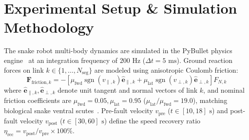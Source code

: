 \documentclass{iopjournal}
\begin{document}
\section{Experimental Setup \& Simulation Methodology}
\label{sec:setup}

The snake robot multi-body dynamics are simulated in the PyBullet physics engine~\cite{coumans2023} at an integration frequency of $200\text{ Hz}$ ($\Delta t = 5\text{ ms}$). Ground reaction forces on link $k \in \{1, \dots, N_{\text{seg}}\}$ are modeled using anisotropic Coulomb friction:
\begin{equation}
\mathbf{F}_{\text{friction}, k} = -\left[\mu_{\text{fwd}} \operatorname{sgn}(v_{\parallel, k}) \hat{\mathbf{e}}_{\parallel, k} + \mu_{\text{lat}} \operatorname{sgn}(v_{\perp, k}) \hat{\mathbf{e}}_{\perp, k}\right] F_{N, k}
\label{eq:friction_model}
\end{equation}
where $\hat{\mathbf{e}}_{\parallel, k}, \hat{\mathbf{e}}_{\perp, k}$ denote unit tangent and normal vectors of link $k$, and nominal friction coefficients are $\mu_{\text{fwd}} = 0.05, \mu_{\text{lat}} = 0.95$ ($\mu_{\text{lat}} / \mu_{\text{fwd}} = 19.0$), matching biological snake ventral scutes~\cite{hirose1993,transeth2009}. Pre-fault velocity $v_{\text{pre}}$ ($t \in [10, 18]\text{ s}$) and post-fault velocity $v_{\text{post}}$ ($t \in [30, 60]\text{ s}$) define the speed recovery ratio $\eta_{\text{rec}} = v_{\text{post}} / v_{\text{pre}} \times 100\%$.
\end{document}
